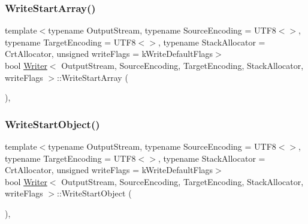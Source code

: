 \subsubsection{\texorpdfstring{Write\+Start\+Array()}{WriteStartArray()}}
{\footnotesize\ttfamily template$<$typename Output\+Stream, typename Source\+Encoding = U\+T\+F8$<$$>$, typename Target\+Encoding = U\+T\+F8$<$$>$, typename Stack\+Allocator = Crt\+Allocator, unsigned write\+Flags = k\+Write\+Default\+Flags$>$ \\
bool \hyperlink{classWriter}{Writer}$<$ Output\+Stream, Source\+Encoding, Target\+Encoding, Stack\+Allocator, write\+Flags $>$\+::Write\+Start\+Array (\begin{DoxyParamCaption}{ }\end{DoxyParamCaption})\hspace{0.3cm}{\ttfamily [inline]}, {\ttfamily [protected]}}

\mbox{\label{classWriter_a81c72a2eecd47e042f56ca93a27a5cb1}} 
\subsubsection{\texorpdfstring{Write\+Start\+Object()}{WriteStartObject()}}
{\footnotesize\ttfamily template$<$typename Output\+Stream, typename Source\+Encoding = U\+T\+F8$<$$>$, typename Target\+Encoding = U\+T\+F8$<$$>$, typename Stack\+Allocator = Crt\+Allocator, unsigned write\+Flags = k\+Write\+Default\+Flags$>$ \\
bool \hyperlink{classWriter}{Writer}$<$ Output\+Stream, Source\+Encoding, Target\+Encoding, Stack\+Allocator, write\+Flags $>$\+::Write\+Start\+Object (\begin{DoxyParamCaption}{ }\end{DoxyParamCaption})\hspace{0.3cm}{\ttfamily [inline]}, {\ttfamily [protected]}}

\mbox{\label{classWriter_acda4412ef5f4cac6e89f9544e4b10f70}} 

